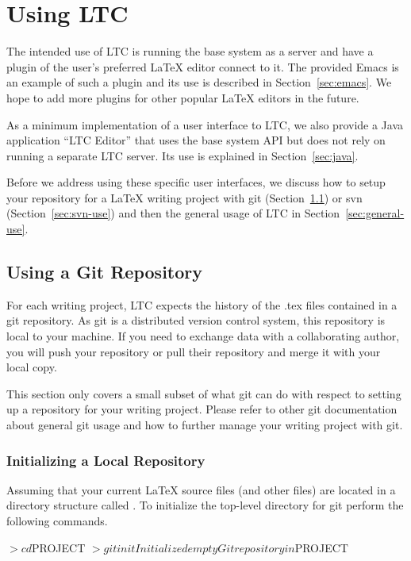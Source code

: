 \chapter{Using LTC}

The intended use of LTC is running the base system as a server and have a plugin of the user's preferred LaTeX editor connect to it.  The provided Emacs  is an example of such a plugin and its use is described in Section~\ref{sec:emacs}.  We hope to add more plugins for other popular LaTeX editors in the future.

As a minimum implementation of a user interface to LTC, we also provide a Java application ``LTC Editor'' that uses the base system API but does not rely on running a separate LTC server.  Its use is explained in Section~\ref{sec:java}.

Before we address using these specific user interfaces, we discuss how to setup your repository for a LaTeX writing project with git (Section~\ref{sec:git-use}) or svn (Section~\ref{sec:svn-use}) and then the general usage of LTC in Section~\ref{sec:general-use}.

\section{Using a Git Repository} \label{sec:git-use}

For each writing project, LTC expects the history of the .tex files contained in a git repository.  As git is a distributed version control system, this repository is local to your machine.  If you need to exchange data with a collaborating author, you will push your repository or pull their repository and merge it with your local copy.

This section only covers a small subset of what git can do with respect to setting up a repository for your writing project.  Please refer to other git documentation about general git usage and how to further manage your writing project with git.

\subsection{Initializing a Local Repository}

Assuming that your current LaTeX source files (and other files) are located in a directory structure called .  To initialize the top-level directory for git perform the following commands.
\begin{CodeVerbatim}
$> cd $PROJECT
$> git init 
Initialized empty Git repository in $PROJECT
\end{CodeVerbatim}

